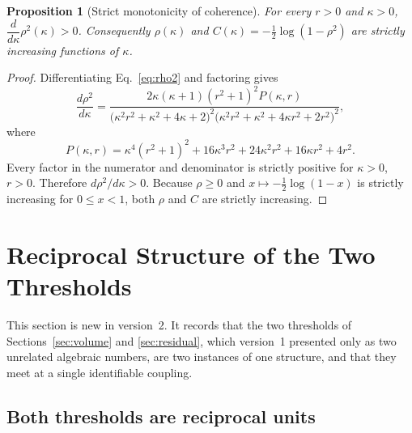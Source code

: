 \documentclass[11pt]{article}
\theoremstyle{plain}
\newtheorem{proposition}{Proposition}
\theoremstyle{remark}
\begin{document}
\begin{proposition}[Strict monotonicity of coherence]\label{prop:mono}
For every $r>0$ and $\kappa>0$, $\dfrac{d}{d\kappa}\rho^2(\kappa)>0$. Consequently $\rho(\kappa)$
and $C(\kappa)=-\tfrac12\log(1-\rho^2)$ are strictly increasing functions of $\kappa$.
\end{proposition}

\begin{proof}
Differentiating Eq.~\eqref{eq:rho2} and factoring gives
\begin{equation}
  \frac{d\rho^2}{d\kappa}
  =\frac{2\kappa(\kappa+1)(r^2+1)^2P(\kappa,r)}
    {\bigl(\kappa^2r^2+\kappa^2+4\kappa+2\bigr)^2
     \bigl(\kappa^2r^2+\kappa^2+4\kappa r^2+2r^2\bigr)^2}, \label{eq:drho}
\end{equation}
where
\begin{equation}
  P(\kappa,r)=\kappa^4(r^2+1)^2+16\kappa^3r^2+24\kappa^2r^2+16\kappa r^2+4r^2. \label{eq:P}
\end{equation}
Every factor in the numerator and denominator is strictly positive for $\kappa>0$, $r>0$.
Therefore $d\rho^2/d\kappa>0$. Because $\rho\ge0$ and $x\mapsto-\tfrac12\log(1-x)$ is strictly
increasing for $0\le x<1$, both $\rho$ and $C$ are strictly increasing.
\end{proof}

\section{Reciprocal Structure of the Two Thresholds}\label{sec:reciprocal}

This section is new in version~2. It records that the two thresholds of
Sections~\ref{sec:volume} and \ref{sec:residual}, which version~1 presented only as two
unrelated algebraic numbers, are two instances of one structure, and that they meet at a single
identifiable coupling.

\subsection{Both thresholds are reciprocal units}
\end{document}
